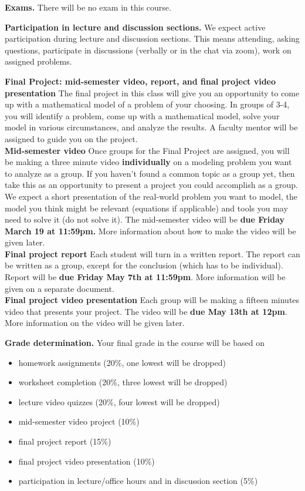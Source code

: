 \documentclass{article}
\newcommand{\secskip}{\vspace{6pt}}
\begin{document}
\secskip

\textbf{Exams.} There will be no exam in this course.
\secskip

\textbf{Participation in lecture and discussion sections.} We expect active participation during lecture and discussion sections. This means attending, asking questions, participate in discussions (verbally or in the chat via zoom), work on assigned problems.

\secskip
\textbf{Final Project: mid-semester video, report, and final project video presentation} The final project in this class will give you an opportunity to come up with a mathematical model of a problem of your choosing. In groups of 3-4, you will identify a problem, come up with a mathematical model, solve your model in various circumstances, and analyze the results. A faculty mentor will be assigned to guide you on the project.\\
\textbf{Mid-semester video} Once groups for the Final Project are assigned, you will be making a three minute video \textbf{individually} on a modeling problem you want to analyze as a group. If you haven't found a common topic as a group yet, then take this as an opportunity to present a project you could accomplish as a group. We expect a short presentation of the real-world problem you want to model, the model you think might be relevant (equations if applicable) and tools you may need to solve it (do not solve it). The mid-semester video will be \textbf{due Friday March 19 at 11:59pm.} More information about how to make the video will be given later.\\
\textbf{Final project report} Each student will turn in a written report. The report can be written as a group, except for the conclusion (which has to be individual). Report will be \textbf{due Friday May 7th at 11:59pm}. More information will be given on a separate document.\\
\textbf{Final project video presentation} Each group will be making a fifteen minutes video that presents your project. The video will be \textbf{due May 13th at 12pm}. More information on the video will be given later.



\secskip

\textbf{Grade determination.} Your final grade in the course will be based on
\begin{itemize}
\item homework assignments (20\%, one lowest will be dropped)
\item worksheet completion (20\%, three lowest will be dropped)
\item lecture video quizzes (20\%, four lowest will be dropped)
\item mid-semester video project (10\%)
\item final project report (15\%)  
\item final project video presentation (10\%)
\item participation in lecture/office hours and in discussion section (5\%)
\end{itemize}
\end{document}
